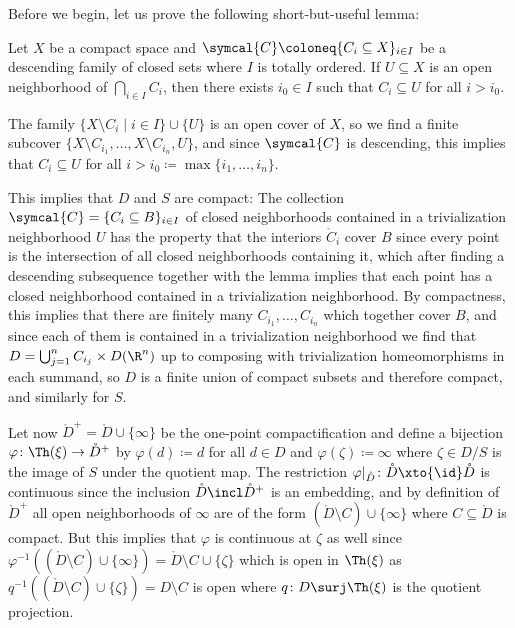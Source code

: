 \begin{solution}
\begin{enumerate}
			Before we begin, let us prove the following short-but-useful lemma:
			\begin{lemma}
				Let $X$ be a compact space and $\symcal{C} \coloneq \{C_i \subseteq X\}_{i \in I}$ be a descending family of closed sets where $I$ is totally ordered.
				If $U \subseteq X$ is an open neighborhood of $\bigcap_{i \in I} C_i$, then there exists $i_0 \in I$ such that $C_i \subseteq U$ for all $i > i_0$.
			\end{lemma}
			\begin{smallproof}
				The family $\{X \setminus C_i \mid i \in I\} \cup \{U\}$ is an open cover of $X$, so we find a finite subcover $\{X \setminus C_{i_1}, \ldots, X \setminus C_{i_n}, U\}$, and since $\symcal{C}$ is descending, this implies that $C_i \subseteq U$ for all $i > i_0 \coloneq \max\{i_1, \ldots, i_n\}$.
			\end{smallproof}
			This implies that $D$ and $S$ are compact:
			The collection $\symcal{C} = \{C_i \subseteq B\}_{i \in I}$ of closed neighborhoods contained in a trivialization neighborhood $U$ has the property that the interiors $\mathring{C}_i$ cover $B$ since every point is the intersection of all closed neighborhoods containing it, which after finding a descending subsequence together with the lemma implies that each point has a closed neighborhood contained in a trivialization neighborhood.
			By compactness, this implies that there are finitely many $C_{i_1}, \ldots, C_{i_n}$ which together cover $B$, and since each of them is contained in a trivialization neighborhood we find that $D = \bigcup_{j = 1}^n C_{i_j} \times D(\R^n)$ up to composing with trivialization homeomorphisms in each summand, so $D$ is a finite union of compact subsets and therefore compact, and similarly for $S$.

			Let now $\mathring{D}^+ = \mathring{D} \cup \{\infty\}$ be the one-point compactification and define a bijection $\varphi\colon \Th(\xi) \to \mathring{D}^+$ by $\varphi(d) \coloneq d$ for all $d \in D$ and $\varphi(\zeta) \coloneq \infty$ where $\zeta \in D / S$ is the image of $S$ under the quotient map.
			The restriction $\varphi|_{\mathring{D}}\colon \mathring{D} \xto{\id} \mathring{D}$ is continuous since the inclusion $\mathring{D} \incl \mathring{D}^+$ is an embedding, and by definition of $\mathring{D}^+$ all open neighborhoods of $\infty$ are of the form $(\mathring{D} \setminus C) \cup \{\infty\}$ where $C \subseteq \mathring{D}$ is compact.
			But this implies that $\varphi$ is continuous at $\zeta$ as well since $\varphi^{-1}((\mathring{D} \setminus C) \cup \{\infty\}) = \mathring{D} \setminus C \cup \{\zeta\}$ which is open in $\Th(\xi)$ as $q^{-1}((\mathring{D} \setminus C) \cup \{\zeta\}) = D \setminus C$ is open where $q\colon D \surj \Th(\xi)$ is the quotient projection.


\end{enumerate}
\end{solution}
